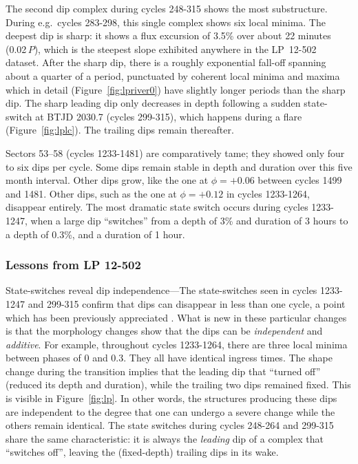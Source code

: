 \documentclass[11pt,twocolumn,tighten]{aastex63}
\begin{document}
The second dip complex during cycles 248-315 shows the most
substructure.  During e.g.~cycles 283-298, this single complex shows
six local minima.  The deepest dip is sharp: it shows a flux excursion
of 3.5\% over about 22 minutes (0.02\,$P$), which is the steepest
slope exhibited anywhere in the LP~12-502 dataset.  After the sharp
dip, there is a roughly exponential fall-off spanning about a quarter
of a period, punctuated by coherent local minima and maxima which in
detail (Figure~\ref{fig:lpriver0}) have slightly longer periods than
the sharp dip.  The sharp leading dip only decreases in depth
following a sudden state-switch at BTJD 2030.7 (cycles 299-315), which
happens during a flare (Figure~\ref{fig:lplc}).  The trailing dips
remain thereafter.

Sectors 53--58 (cycles 1233-1481) are comparatively tame; they showed
only four to six dips per cycle.  Some dips remain stable in depth and
duration over this five month interval.  Other dips grow, like the one
at $\phi = +0.06$ between cycles 1499 and 1481.  Other dips, such as
the one at $\phi = +0.12$ in cycles 1233-1264, disappear entirely.
The most dramatic state switch occurs during cycles 1233-1247, when a
large dip ``switches'' from a depth of 3\% and duration of 3 hours to
a depth of 0.3\%, and a duration of 1 hour.


\subsubsection{Lessons from LP 12-502}
\label{subsec:lplessons}

{\sc State-switches reveal dip independence}---The state-switches seen
in cycles 1233-1247 and 299-315 confirm that dips can disappear in
less than one cycle, a point which has been previously appreciated
\citep{2017AJ....153..152S}.  What is new in these particular changes
is that the morphology changes show that the dips can be {\it
independent} and {\it additive}.  For example, throughout cycles
1233-1264, there are three local minima between phases of 0 and 0.3.
They all have identical ingress times.  The shape change during the
transition implies that the leading dip that ``turned off'' (reduced
its depth and duration), while the trailing two dips remained fixed.
This is visible in Figure~\ref{fig:lp}.  In other words, the
structures producing these dips are independent to the degree that one
can undergo a severe change while the others remain identical.  The
state switches during cycles 248-264 and 299-315 share the same
characteristic: it is always the {\it leading} dip of a complex that
``switches off'', leaving the (fixed-depth) trailing dips in its wake.
\end{document}
